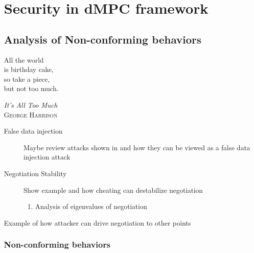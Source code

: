 \documentclass[../main.tex]{subfiles}
\begin{document}




\part{Security in dMPC framework}
\chapter{Analysis of Non-conforming behaviors}

\epigraph{\centering All the world\\ is birthday cake,\\ so take a piece, \\but not too much.}
{\textit{It's All Too Much}\\\textsc{George Harrison}}

\minitoc

\begin{description}
  \item[False data injection] Maybe review attacks shown in \cite{VelardeEtAl2017} and how they can be viewed as a false data injection attack
  \item[Negotiation Stability] Show example and how cheating can destabilize negotiation
        \begin{enumerate}
          \item Analysis of eigenvalues of negotiation
        \end{enumerate}
  \item[Example of how attacker can drive negotiation to other points]
\end{description}

\section{Non-conforming behaviors}

\printbibliography
\end{document}
